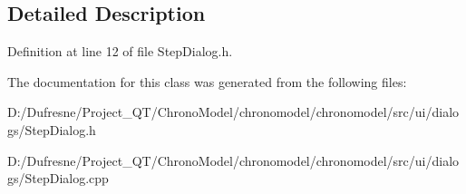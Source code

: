 \subsection{Detailed Description}


Definition at line 12 of file Step\-Dialog.\-h.



The documentation for this class was generated from the following files\-:\begin{DoxyCompactItemize}
\item 
D\-:/\-Dufresne/\-Project\-\_\-\-Q\-T/\-Chrono\-Model/chronomodel/chronomodel/src/ui/dialogs/Step\-Dialog.\-h\item 
D\-:/\-Dufresne/\-Project\-\_\-\-Q\-T/\-Chrono\-Model/chronomodel/chronomodel/src/ui/dialogs/Step\-Dialog.\-cpp\end{DoxyCompactItemize}
